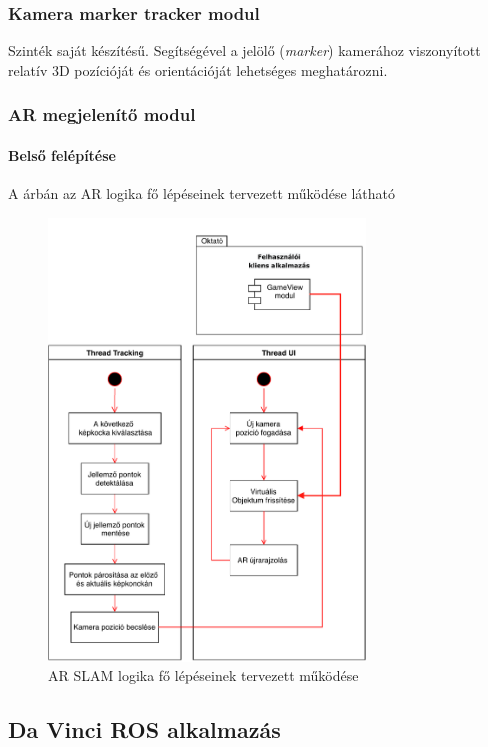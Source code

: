 \documentclass[12pt,a4paper,oneside]{report} %
\begin{document}
\subsubsection{Kamera marker tracker modul}
Szinték saját készítésű. Segítségével a jelölő (\textit{marker}) kamerához viszonyított relatív 3D pozícióját és orientációját lehetséges meghatározni.
\subsubsection{AR megjelenítő modul}

\paragraph{Belső felépítése}
A   árbán az AR logika fő lépéseinek tervezett működése látható
\begin{figure}[h]
	\label{fig:arseq}
	\centering
	\includegraphics[width=0.75\textwidth]{dias/arseq}
	\caption{AR SLAM logika fő lépéseinek tervezett működése}
\end{figure}

\subsection{Da Vinci ROS alkalmazás}
\end{document}
